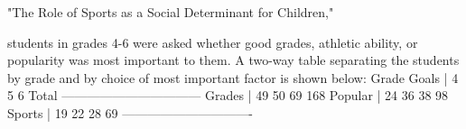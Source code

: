 


"The Role of Sports as a Social Determinant for Children,"

students in grades 4-6 were asked whether good grades, athletic ability, or popularity was most important to them. A two-way table separating the students by grade and by choice of most important factor is shown below:
	      Grade
Goals   | 4  	5     6	    Total 
---------------------------------
Grades  | 49 	50    69    168		    	
Popular | 24 	36    38     98	
Sports  | 19 	22    28     69
-------------------------------


